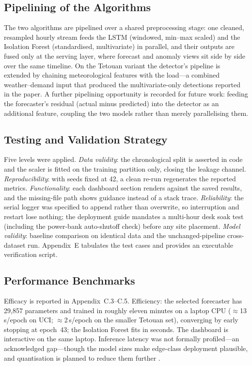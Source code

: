 \documentclass[11pt,a4paper]{article}
\begin{document}
\subsection{Pipelining of the Algorithms}
The two algorithms are pipelined over a shared preprocessing stage: one cleaned,
resampled hourly stream feeds the LSTM (windowed, min--max scaled) and the
Isolation Forest (standardised, multivariate) in parallel, and their outputs are
fused only at the serving layer, where forecast and anomaly views sit side by
side over the same timeline. On the Tetouan variant the detector's pipeline is
extended by chaining meteorological features with the load---a combined
weather--demand input that produced the multivariate-only detections reported in
the paper. A further pipelining opportunity is recorded for future work: feeding
the forecaster's residual (actual minus predicted) into the detector as an
additional feature, coupling the two models rather than merely parallelising
them.

\subsection{Testing and Validation Strategy}
Five levels were applied. \emph{Data validity}: the chronological split is
asserted in code and the scaler is fitted on the training partition only,
closing the leakage channel. \emph{Reproducibility}: with seeds fixed at 42, a
clean re-run regenerates the reported metrics. \emph{Functionality}: each
dashboard section renders against the saved results, and the missing-file path
shows guidance instead of a stack trace. \emph{Reliability}: the serial logger
was specified to append rather than overwrite, so interruption and restart lose
nothing; the deployment guide mandates a multi-hour desk soak test (including
the power-bank auto-shutoff check) before any site placement. \emph{Model
validity}: baseline comparison on identical data and the unchanged-pipeline
cross-dataset run. Appendix~E tabulates the test cases and provides an
executable verification script.

\subsection{Performance Benchmarks}
Efficacy is reported in Appendix~C.3--C.5. Efficiency: the selected forecaster
has 29{,}857 parameters and trained in roughly eleven minutes on a laptop CPU
($\approx$13\,s/epoch on UCI; $\approx$2\,s/epoch on the smaller Tetouan set),
converging by early stopping at epoch~43; the Isolation Forest fits in seconds.
The dashboard is interactive on the same laptop. Inference latency was not
formally profiled---an acknowledged gap---though the model sizes make
edge-class deployment plausible, and quantisation is planned to reduce them
further \cite{warden2019tinyml}.
\end{document}
